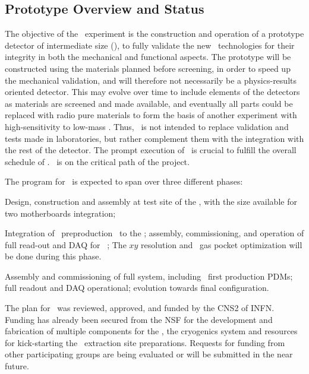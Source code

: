 \subsection{\DSp}
\label{sec:Proto}

\subsection{Prototype Overview and Status}
The objective of the \DSps\ experiment is the construction and operation of a prototype detector of intermediate size (\DSpApproximateMass), to fully validate the new \DSks\ technologies for their integrity in both the mechanical and functional aspects.  The prototype will be constructed using the materials planned before screening, in order to speed up the mechanical validation, and will therefore not necessarily be a physics-results oriented detector. This may evolve over time to include elements of the detectors as materials are screened and made available, and eventually all parts could be replaced with radio pure materials to form the basis of another experiment with high-sensitivity to low-mass \WIMPs.  Thus, \DSps\  is not intended to replace validation and tests made in laboratories, but rather complement them with the integration with the rest of the detector.  The prompt execution of \DSps\ is crucial to fulfill the overall schedule of \DSks.  \DSps\ is on the critical path of the project.

The program for \DSps\ is expected to span over three different phases:
\begin{compactenum}
\item Design, construction and assembly at test site of the \LArTPC, with the size available for two motherboards integration;
\item Integration of \DSpZeroPdmsNumber\ preproduction \DSkPdms\ to the \LArTPC; assembly, commissioning, and operation of full read-out and DAQ for \DSpZeroPdmsNumber\ \DSkPdms; The $x y$ resolution and \STwo\ gas pocket optimization will be done during this phase.
\item Assembly and commissioning of full system, including \DSpPdmsNumber\ first production PDMs; full readout and DAQ operational; evolution towards final configuration. 
\end{compactenum}

The plan for \DSps\ was reviewed, approved, and funded by the CNS2 of INFN. Funding has already been secured from the NSF for the development and fabrication of multiple components for the \TPC, the cryogenics system and resources for kick-starting the \UAr\ extraction site preparations.  Requests for funding from other participating groups are being evaluated or will be submitted in the near future.

